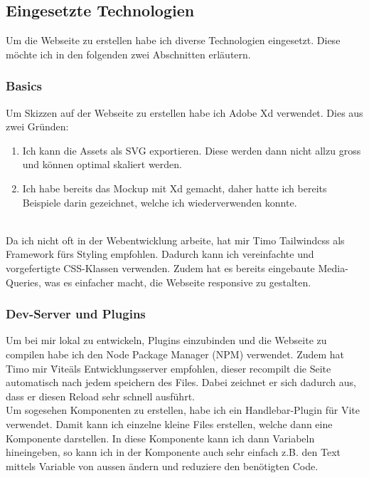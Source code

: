 \documentclass[11pt]{article}
\begin{document}
    \subsection{Eingesetzte Technologien}
    Um die Webseite zu erstellen habe ich diverse Technologien eingesetzt. Diese möchte ich in den folgenden zwei Abschnitten erläutern.

    \subsubsection{Basics}
    Um Skizzen auf der Webseite zu erstellen habe ich Adobe Xd verwendet. Dies aus zwei Gründen:
    \begin{enumerate}
        \item Ich kann die Assets als SVG exportieren. Diese werden dann nicht allzu gross und können optimal skaliert werden.
        \item Ich habe bereits das Mockup mit Xd gemacht, daher hatte ich bereits Beispiele darin gezeichnet, welche ich wiederverwenden konnte.
    \end{enumerate}
    \\
    Da ich nicht oft in der Webentwicklung arbeite, hat mir Timo Tailwindcss als Framework fürs Styling empfohlen. Dadurch kann ich vereinfachte
    und vorgefertigte CSS-Klassen verwenden. Zudem hat es bereits eingebaute Media-Queries, was es einfacher macht, die Webseite responsive
    zu gestalten.

    \subsubsection{Dev-Server und Plugins}
    Um bei mir lokal zu entwickeln, Plugins einzubinden und die Webseite zu compilen habe ich den Node Package Manager (NPM) verwendet.
    Zudem hat Timo mir \"Vite\" als Entwicklungsserver empfohlen, dieser recompilt die Seite automatisch nach jedem speichern des Files.
    Dabei zeichnet er sich dadurch aus, dass er diesen Reload sehr schnell ausführt.\\
    Um sogesehen Komponenten zu erstellen, habe ich ein Handlebar-Plugin für Vite verwendet. Damit kann ich einzelne kleine Files erstellen,
    welche dann eine Komponente darstellen. In diese Komponente kann ich dann Variabeln hineingeben, so kann ich in der Komponente auch sehr
    einfach z.B. den Text mittels Variable von aussen ändern und reduziere den benötigten Code.
\end{document}
